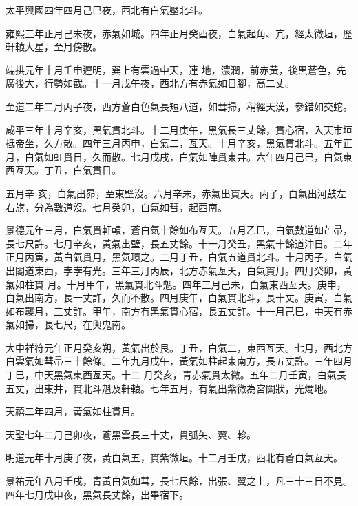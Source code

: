 \begin{pinyinscope}
 太平興國四年四月己巳夜，西北有白氣壓北斗。



 雍熙三年正月己未夜，赤氣如城。四年正月癸酉夜，白氣起角、亢，經太微垣，歷軒轅大星，至月傍散。



 端拱元年十月壬申遲明，巽上有雲過中天，連
 地，濃潤，前赤黃，後黑蒼色，先廣後大，行勢如截。十一月戊午夜，西北方有赤氣如日腳，高二丈。



 至道二年二月丙子夜，西方蒼白色氣長短八道，如彗掃，稍經天漢，參錯如交蛇。



 咸平三年十月辛亥，黑氣貫北斗。十二月庚午，黑氣長三丈餘，貫心宿，入天市垣抵帝坐，久方散。四年三月丙申，白氣二，亙天。十月辛亥，黑氣貫北斗。五年正月，白氣如虹貫日，久而散。七月戊戌，白氣如陣貫東井。六年四月己巳，白氣東西亙天。丁丑，白氣貫日。



 五月辛
 亥，白氣出昴，至東壁沒。六月辛未，赤氣出貫天。丙子，白氣出河鼓左右旗，分為數道沒。七月癸卯，白氣如彗，起西南。



 景德元年三月，白氣貫軒轅，蒼白氣十餘如布亙天。五月乙巳，白氣數道如芒帚，長七尺許。七月辛亥，黃氣出壁，長五丈餘。十一月癸丑，黑氣十餘道沖日。二年正月丙寅，黃白氣貫月，黑氣環之。二月丁丑，白氣五道貫北斗。十月丙子，白氣出閣道東西，孛孛有光。三年三月丙辰，北方赤氣亙天，白氣貫月。四月癸卯，黃氣如柱貫
 月。十月甲午，黑氣貫北斗魁。四年三月己未，白氣東西亙天。庚申，白氣出南方，長一丈許，久而不散。四月庚午，白氣貫北斗，長十丈。庚寅，白氣如布襲月，三丈許。甲午，南方有黑氣貫心宿，長五丈許。十一月己巳，中天有赤氣如掃，長七尺，在輿鬼南。



 大中祥符元年正月癸亥朔，黃氣出於艮。丁丑，白氣二，東西亙天。七月，西北方白雲氣如彗帚三十餘條。二年九月戊午，黃氣如柱起東南方，長五丈許。三年四月丁巳，中天黑氣東西亙天。十二
 月癸亥，青赤氣貫太微。五年二月壬寅，白氣長五丈，出東井，貫北斗魁及軒轅。七年五月，有氣出紫微為宮闕狀，光燭地。



 天禧二年四月，黃氣如柱貫月。



 天聖七年二月己卯夜，蒼黑雲長三十丈，貫弧矢、翼、軫。



 明道元年十月庚子夜，黃白氣五，貫紫微垣。十二月壬戌，西北有蒼白氣亙天。



 景祐元年八月壬戌，青黃白氣如彗，長七尺餘，出張、翼之上，凡三十三日不見。四年七月戊申夜，黑氣長丈餘，出畢宿下。




\end{pinyinscope}
